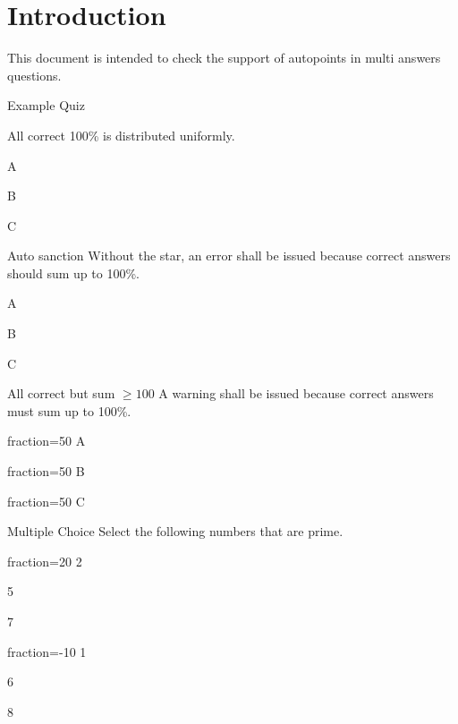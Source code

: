 \documentclass{article}
\begin{document}
\section*{Introduction}

This document is intended to check the support of autopoints in multi answers 
questions.

\begin{quiz}{Example Quiz}
\begin{multi}[multiple]{All correct}
100\% is distributed uniformly.
\item* A
\item* B
\item* C
\end{multi}
\begin{multi}[multiple]{Auto sanction}
Without the star, an error shall be issued because correct answers should sum 
up to 100\%.
\item* A
\item B
\item C
\end{multi}
\begin{multi}[multiple]{All correct but sum $\geq 100$}
A warning shall be issued because correct answers must sum up to 100\%.
\item[fraction=50] A
\item[fraction=50] B
\item[fraction=50] C
\end{multi}
\begin{multi}[multiple]{Multiple Choice}
Select the following numbers that are prime.
\item[fraction=20] 2
\item* 5
\item* 7
\item[fraction=-10] 1 
\item 6
\item 8
\end{multi}
\end{quiz}
\end{document}
